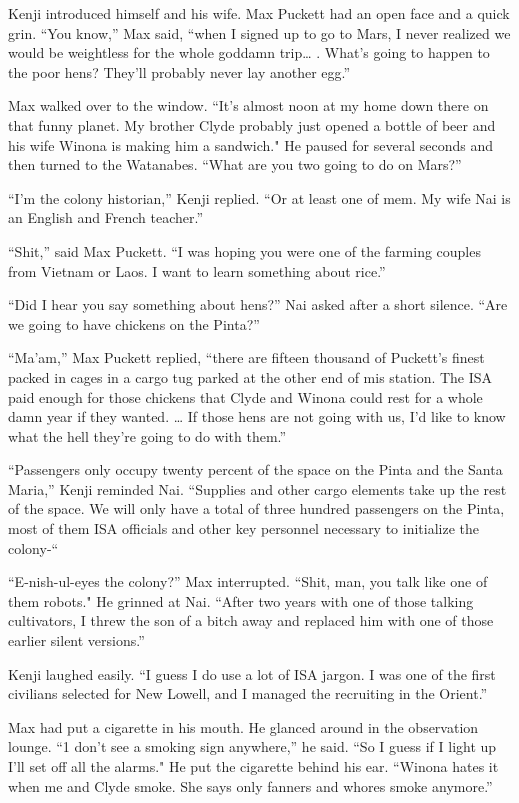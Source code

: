 \documentclass[]{article}
\begin{document}
{Kenji introduced himself and his wife.  Max Puckett had an open face and a quick grin.  “You know,” Max said, “when I signed up to go to Mars, I never realized we would be weightless for the whole goddamn trip… .  What’s going to happen to the poor hens? They’ll probably never lay another egg.”

Max walked over to the window.  “It’s almost noon at my home down there on that funny planet.  My brother Clyde probably just opened a bottle of beer and his wife Winona is making him a sandwich."  He paused for several seconds and then turned to the Watanabes.  “What are you two going to do on Mars?”

“I’m the colony historian,” Kenji replied.  “Or at least one of mem.  My wife Nai is an English and French teacher.”

“Shit,” said Max Puckett.  “I was hoping you were one of the farming couples from Vietnam or Laos.  I want to learn something about rice.”

“Did I hear you say something about hens?” Nai asked after a short silence.  “Are we going to have chickens on the Pinta?”

“Ma’am,” Max Puckett replied, “there are fifteen thousand of Puckett’s finest packed in cages in a cargo tug parked at the other end of mis station.  The ISA paid enough for those chickens that Clyde and Winona could rest for a whole damn year if they wanted.  … If those hens are not going with us, I’d like to know what the hell they’re going to do with them.”

“Passengers only occupy twenty percent of the space on the Pinta and the Santa Maria,” Kenji reminded Nai.  “Supplies and other cargo elements take up the rest of the space.  We will only have a total of three hundred passengers on the Pinta, most of them ISA officials and other key personnel necessary to initialize the colony-“

“E-nish-ul-eyes the colony?” Max interrupted.  “Shit, man, you talk like one of them robots."  He grinned at Nai.  “After two years with one of those talking cultivators, I threw the son of a bitch away and replaced him with one of those earlier silent versions.”

Kenji laughed easily.  “I guess I do use a lot of ISA jargon.  I was one of the first civilians selected for New Lowell, and I managed the recruiting in the Orient.”

Max had put a cigarette in his mouth.  He glanced around in the observation lounge.  “1 don’t see a smoking sign anywhere,” he said.  “So I guess if I light up I’ll set off all the alarms."  He put the cigarette behind his ear.  “Winona hates it when me and Clyde smoke.  She says only fanners and whores smoke anymore.”

}
\end{document}
